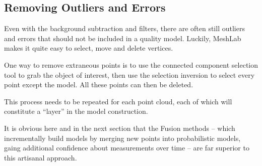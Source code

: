 \subsection{Removing Outliers and Errors}

Even with the background subtraction and filters, there are often still
outliers and errors that should not be included in a quality model.
Luckily, MeshLab \cite{cignoni2008meshlab} makes it quite easy to select,
move and delete vertices.

One way to remove extraneous points is to use the connected component selection
tool to grab the object of interest, then use the selection inversion to select
every point except the model. All these points can then be deleted.

This process needs to be repeated for each point cloud, each of which will constitute
a ``layer'' in the model construction.

It is obvious here and in the next section that the Fusion methods -- which
incrementally build models by merging new points into probabilistic models,
gaing additional confidence about measurements over time --
are far superior to this artisanal approach.


\subsection{}

